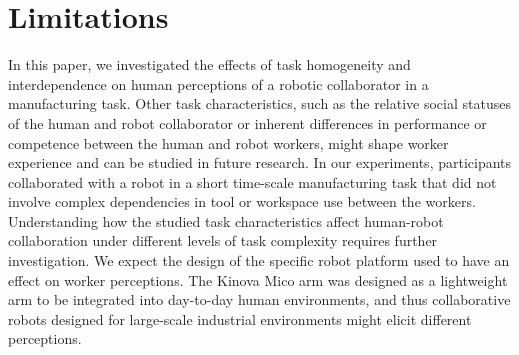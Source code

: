 \section{Limitations}
       In this paper, we investigated the effects of task homogeneity and interdependence on human perceptions of a robotic collaborator in a manufacturing task. Other task characteristics, such as the relative social statuses of the human and robot collaborator or inherent differences in performance or competence between the human and robot workers, might shape worker experience and can be studied in future research. 
       In our experiments, participants collaborated with a robot in a short time-scale manufacturing task that did not involve complex dependencies in tool or workspace use between the workers. Understanding how the studied task characteristics affect human-robot collaboration under different levels of task complexity requires further investigation.
       We expect the design of the specific robot platform used to have an effect on worker perceptions. The Kinova Mico arm was designed as a lightweight arm to be integrated into day-to-day human environments, and thus collaborative robots designed for large-scale industrial environments might elicit different perceptions. 
